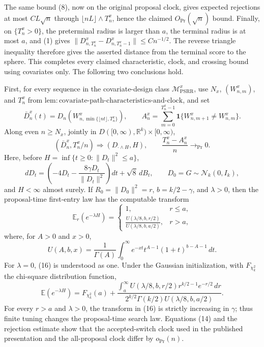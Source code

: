 The same bound (8), now on the original proposal clock, gives expected rejections at most \(CL\sqrt n\) through \(\lfloor nL\rfloor\wedge T_n^x\), hence the claimed \(O_{\Pr}(\sqrt n)\) bound.  Finally, on \(\{T_n^x>0\}\), the preterminal radius is larger than \(a\), the terminal radius is at most \(a\), and (1) gives \(\|D^x_{n,T_n^x}-D^x_{n,T_n^x-1}\|\le Cn^{-1/2}\).  The reverse triangle inequality therefore gives the asserted distance from the terminal score to the sphere.  This completes every claimed characteristic, clock, and crossing bound using covariates only.
The following two conclusions hold.

First, for every sequence in the covariate-design class \(\mathcal M_{\mathrm{PSRR}}^{x}\), use \(N_x\), \((W^x_{n,m})\), and \(T_n^x\) from \(\mathrm{lem{:}covariate\mbox{-}path\mbox{-}characteristics\mbox{-}and\mbox{-}clock}\), and set
\[
 \bar D_n^x(t)=D_n\!\left(W^x_{n,\min\{\lfloor nt\rfloor,T_n^x\}}\right),
 \qquad
 A_n^x=\sum_{m=0}^{T_n^x-1}\mathbf 1\{W^x_{n,m+1}\ne W^x_{n,m}\}.
\]
Along even \(n\ge N_x\), jointly in \(D([0,\infty),\mathbb R^k)\times[0,\infty)\),
\[
 (\bar D_n^x,T_n^x/n)\Rightarrow(D_{\cdot\wedge H},H),
 \qquad \frac{T_n^x-A_n^x}{n}\longrightarrow_{\Pr}0. \tag{14}
\]
Here, before \(H=\inf\{t\ge0:\|D_t\|^2\le a\}\),
\[
 dD_t=\left(-4D_t-\frac{8\gamma D_t}{\|D_t\|^2}\right)dt+\sqrt8\,dB_t,
 \qquad D_0=G\sim\mathcal N_k(0,I_k), \tag{15}
\]
and \(H<\infty\) almost surely.  If \(R_0=\|D_0\|^2=r\), \(b=k/2-\gamma\), and \(\lambda>0\), then the proposal-time first-entry law has the computable transform
\[
 \mathbb E_r(e^{-\lambda H})=
 \begin{cases}
 1,&r\le a,\\[2mm]
 \displaystyle\frac{U(\lambda/8,b,r/2)}{U(\lambda/8,b,a/2)},&r>a,
 \end{cases} \tag{16}
\]
where, for \(A>0\) and \(x>0\),
\[
 U(A,b,x)=\frac1{\Gamma(A)}\int_0^\infty e^{-xt}t^{A-1}(1+t)^{b-A-1}\,dt. \tag{17}
\]
For \(\lambda=0\), (16) is understood as one.  Under the Gaussian initialization, with \(F_{\chi_k^2}\) the chi-square distribution function,
\[
 \mathbb E(e^{-\lambda H})=F_{\chi_k^2}(a)+
 \frac{\displaystyle\int_a^\infty U(\lambda/8,b,r/2)r^{k/2-1}e^{-r/2}\,dr}
 {\displaystyle 2^{k/2}\Gamma(k/2)U(\lambda/8,b,a/2)}. \tag{18}
\]
For every \(r>a\) and \(\lambda>0\), the transform in (16) is strictly increasing in \(\gamma\); thus finite tuning changes the proposal-time search law.  Equations (14) and the rejection estimate show that the accepted-switch clock used in the published presentation and the all-proposal clock differ by \(o_{\Pr}(n)\).

